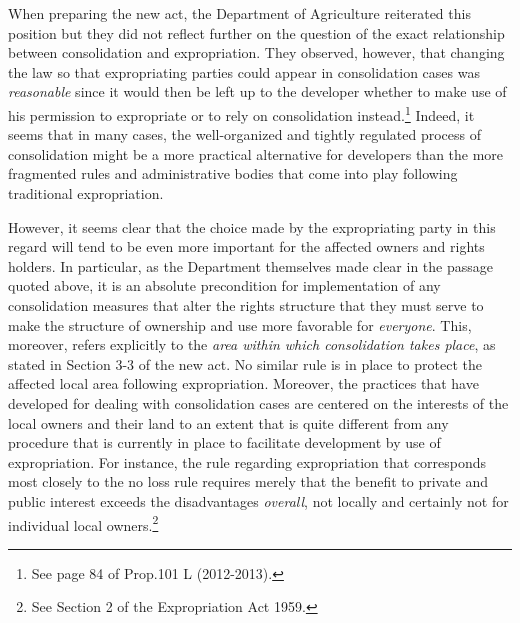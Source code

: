 When preparing the new act, the Department of Agriculture reiterated this position but they did not reflect further on the question of the exact relationship between consolidation and expropriation. They observed, however, that changing the law so that expropriating parties could appear in consolidation cases was \emph{reasonable} since it would then be left up to the developer whether to make use of his permission to expropriate or to rely on consolidation instead.\footnote{See page 84 of Prop.101 L (2012-2013).} Indeed, it seems that in many cases, the well-organized and tightly regulated process of consolidation might be a more practical alternative for developers than the more fragmented rules and administrative bodies that come into play following traditional expropriation. 

However, it seems clear that the choice made by the expropriating party in this regard will tend to be even more important for the affected owners and rights holders. In particular, as the Department themselves made clear in the passage quoted above, it is an absolute precondition for implementation of any consolidation measures that alter the rights structure that they must serve to make the structure of ownership and use more favorable for \emph{everyone}. This, moreover, refers explicitly to the \emph{area within which consolidation takes place}, as stated in Section 3-3 of the new act. No similar rule is in place to protect the affected local area following expropriation. Moreover, the practices that have developed for dealing with consolidation cases are centered on the interests of the local owners and their land to an extent that is quite different from any procedure that is currently in place to facilitate development by use of expropriation.
For instance, the rule regarding expropriation that corresponds most closely to the no loss rule  
requires merely that the benefit to private and public interest exceeds the disadvantages \emph{overall}, not locally and certainly not for individual local owners.\footnote{See Section 2 of the Expropriation Act 1959.} 



